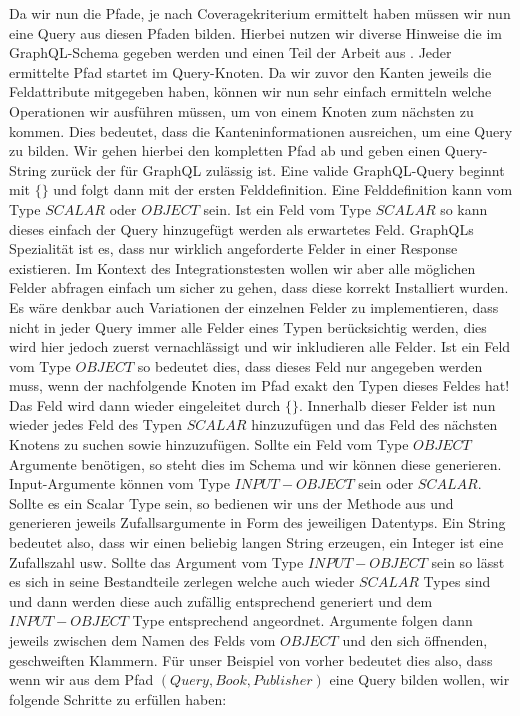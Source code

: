 Da wir nun die Pfade, je nach Coveragekriterium ermittelt haben müssen wir nun eine Query aus diesen Pfaden bilden.
Hierbei nutzen wir diverse Hinweise die im GraphQL-Schema gegeben werden und einen Teil der Arbeit aus \cite[Property-Based Testing]{property-based-testing}.
Jeder ermittelte Pfad startet im Query-Knoten.
Da wir zuvor den Kanten jeweils die Feldattribute mitgegeben haben, können wir nun sehr einfach ermitteln welche
Operationen wir ausführen müssen, um von einem Knoten zum nächsten zu kommen.
Dies bedeutet, dass die Kanteninformationen ausreichen, um eine Query zu bilden.
Wir gehen hierbei den kompletten Pfad ab und geben einen Query-String zurück der für GraphQL zulässig ist.
Eine valide GraphQL-Query beginnt mit $\{ \}$ und folgt dann mit der ersten Felddefinition.
Eine Felddefinition kann vom Type $SCALAR$ oder $OBJECT$ sein.
Ist ein Feld vom Type $SCALAR$ so kann dieses einfach der Query hinzugefügt werden als erwartetes Feld.
GraphQLs Spezialität ist es, dass nur wirklich angeforderte Felder in einer Response existieren.
Im Kontext des Integrationstesten wollen wir aber alle möglichen Felder abfragen einfach um sicher zu gehen, dass
diese korrekt Installiert wurden.
Es wäre denkbar auch Variationen der einzelnen Felder zu implementieren, dass nicht in jeder Query immer alle Felder
eines Typen berücksichtig werden, dies wird hier jedoch zuerst vernachlässigt und wir inkludieren alle Felder.
Ist ein Feld vom Type $OBJECT$ so bedeutet dies, dass dieses Feld nur angegeben werden muss, wenn der nachfolgende Knoten im Pfad
exakt den Typen dieses Feldes hat!
Das Feld wird dann wieder eingeleitet durch $\{ \}$.
Innerhalb dieser Felder ist nun wieder jedes Feld des Typen $SCALAR$ hinzuzufügen und das Feld des nächsten Knotens zu suchen sowie hinzuzufügen.
Sollte ein Feld vom Type $OBJECT$ Argumente benötigen, so steht dies im Schema und wir können diese generieren.
Input-Argumente können vom Type $INPUT-OBJECT$ sein oder $SCALAR$.
Sollte es ein Scalar Type sein, so bedienen wir uns der Methode aus \cite[Property-based Testing]{property-based-testing} und generieren
jeweils Zufallsargumente in Form des jeweiligen Datentyps.
Ein String bedeutet also, dass wir einen beliebig langen String erzeugen, ein Integer ist eine Zufallszahl usw.
Sollte das Argument vom Type $INPUT-OBJECT$ sein so lässt es sich in seine Bestandteile zerlegen welche auch wieder $SCALAR$ Types sind und
dann werden diese auch zufällig entsprechend generiert und dem $INPUT-OBJECT$ Type entsprechend angeordnet.
Argumente folgen dann jeweils zwischen dem Namen des Felds vom $OBJECT$ und den sich öffnenden, geschweiften Klammern.
Für unser Beispiel von vorher bedeutet dies also, dass wenn wir aus dem Pfad $(Query, Book, Publisher)$ eine Query bilden wollen, wir folgende
Schritte zu erfüllen haben:

